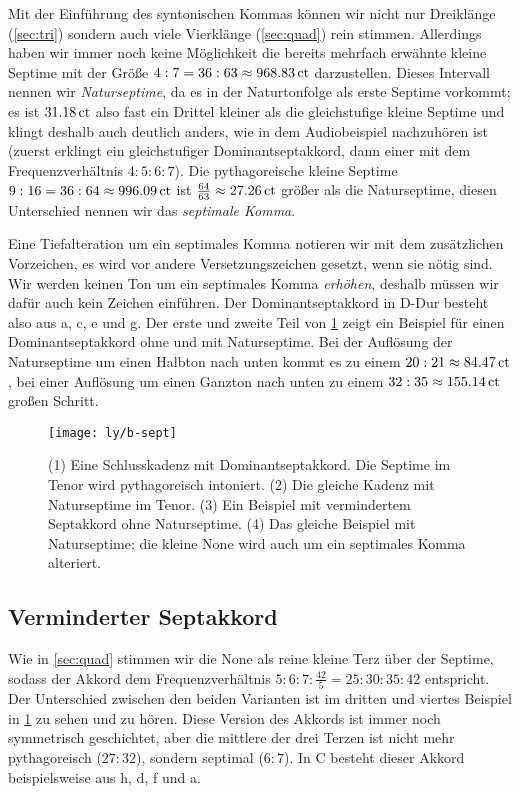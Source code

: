 \documentclass[ngerman,11pt]{scrartcl}
\begin{document}
Mit der Einführung des syntonischen Kommas können wir nicht nur Dreiklänge
(\cref{sec:tri}) sondern auch viele Vierklänge (\cref{sec:quad}) rein stimmen.
Allerdings haben wir immer noch keine Möglichkeit die bereits mehrfach erwähnte
kleine Septime mit der Größe $4:7=36:63\approx 968.83\,\mathrm{ct}$ darzustellen.
Dieses Intervall nennen wir \emph{Naturseptime}, da es in der Naturtonfolge als
erste Septime vorkommt; es ist $31.18\,\mathrm{ct}$ also fast ein Drittel 
kleiner als die gleichstufige kleine Septime und klingt deshalb auch deutlich
anders, wie in dem Audiobeispiel nachzuhören ist (zuerst erklingt
ein gleichstufiger Dominantseptakkord, dann einer mit dem Frequenzverhältnis
$4:5:6:7$). Die pythagoreische kleine Septime
$9:16=36:64\approx 996.09\,\mathrm{ct}$ ist $\frac{64}{63}\approx 27.26\,\mathrm{ct}$
größer als die Naturseptime, diesen Unterschied nennen wir das
\emph{septimale Komma}.

Eine Tiefalteration um ein septimales Komma notieren wir mit dem zusätzlichen
\septimal Vorzeichen, es wird vor andere Versetzungszeichen gesetzt, wenn sie
nötig sind. Wir werden keinen Ton um ein septimales Komma \emph{erhöhen},
deshalb müssen wir dafür auch kein Zeichen einführen. Der Dominantseptakkord in
D-Dur besteht also aus a, \sharpm c, e und \septimal g. Der erste und zweite
Teil von \cref{fig:sept} zeigt ein Beispiel für einen Dominantseptakkord ohne
und mit Naturseptime. Bei der Auflösung der Naturseptime um einen Halbton nach
unten kommt es zu einem $20:21\approx 84.47\,\mathrm{ct}$, bei einer Auflösung um
einen Ganzton nach unten zu einem $32:35\approx 155.14\,\mathrm{ct}$ großen Schritt.

\begin{figure}
	\centering
	\texttt{[image: ly/b-sept]}
	\caption{(1) Eine Schlusskadenz mit Dominantseptakkord. Die Septime im
		Tenor wird pythagoreisch intoniert.
		\quad(2) Die gleiche Kadenz mit Naturseptime im Tenor.
		\quad(3) Ein Beispiel mit vermindertem Septakkord ohne Naturseptime.
		\quad(4) Das gleiche Beispiel mit Naturseptime; die kleine None wird
		auch um ein septimales Komma alteriert.}\label{fig:sept}
\end{figure}

\subsection{Verminderter Septakkord}

Wie in \cref{sec:quad} stimmen wir die None als reine kleine Terz über der
Septime, sodass der Akkord dem Frequenzverhältnis $5:6:7:\frac{42}5 = 25:30:35:42$
entspricht. Der Unterschied zwischen den beiden Varianten ist im dritten und
viertes Beispiel in \cref{fig:sept} zu sehen und zu hören. Diese Version des
Akkords ist immer noch symmetrisch geschichtet, aber die mittlere der drei
Terzen ist nicht mehr pythagoreisch ($27:32$), sondern septimal ($6:7$). In C besteht dieser Akkord beispielsweise aus \naturalm h, d, \septimal f und \septimal \flatp a.
\end{document}
